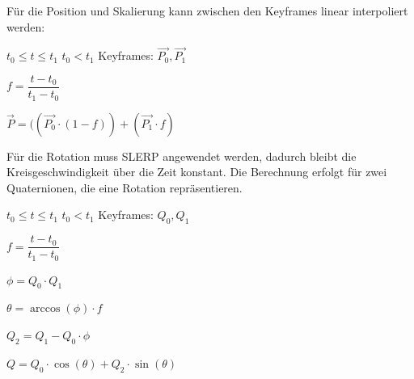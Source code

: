 Für die Position und Skalierung kann zwischen den Keyframes linear interpoliert werden:

$t_{0} \leq t \leq t_{1}$ \qquad $t_{0} < t_{1}$ \qquad Keyframes: $\overrightarrow{P_{0}}, \overrightarrow{P_{1}}$

$f = \dfrac{t - t_{0}}{t_{1} - t_{0}}$

$\overrightarrow{P} = ((\overrightarrow{P_{0}} \cdot (1 - f)) + (\overrightarrow{P_{1}} \cdot f)$

Für die Rotation muss \ac{SLERP}\cite{WikiSlerp} angewendet werden, dadurch bleibt die Kreisgeschwindigkeit über die Zeit konstant. Die Berechnung erfolgt für zwei Quaternionen, die eine Rotation repräsentieren.

$t_{0} \leq t \leq t_{1}$ \qquad $t_{0} < t_{1}$ \qquad Keyframes: $Q_{0}, Q_{1}$

$f = \dfrac{t - t_{0}}{t_{1} - t_{0}}$

$\phi = Q_{0} \cdot Q_{1}$

$\theta = \arccos(\phi) \cdot f$

$Q_{2} = Q_{1} - Q_{0} \cdot \phi$

$Q = Q_{0} \cdot \cos(\theta) + Q_{2} \cdot \sin(\theta)$

